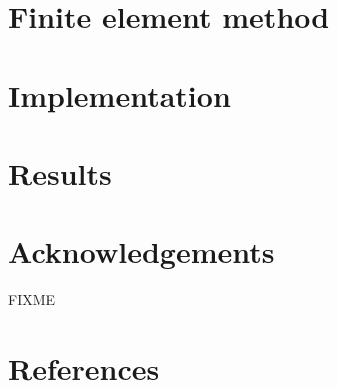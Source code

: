 \documentclass[]{interact}
\theoremstyle{plain}%
\theoremstyle{definition}
\theoremstyle{remark}
\begin{document}
\section{Finite element method} \label{sec:fem}

\section{Implementation} \label{sec:implementation}

\section{Results} \label{sec:results}



\section*{Acknowledgements}

FIXME \cite{Elman2014} \cite{Suttmeier2008}




\section{References}
\end{document}
